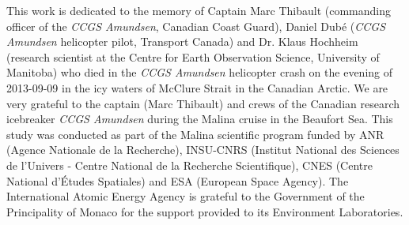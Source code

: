 \documentclass[essd, manuscript]{copernicus}
\begin{document}
\appendixfigures  %

\appendixtables   %




\begin{acknowledgements}
    This work is dedicated to the memory of Captain Marc Thibault (commanding officer of the \textit{CCGS Amundsen}, Canadian Coast Guard), Daniel Dubé (\textit{CCGS Amundsen} helicopter pilot, Transport Canada) and Dr. Klaus Hochheim (research scientist at the Centre for Earth Observation Science, University of Manitoba) who died in the \textit{CCGS Amundsen} helicopter crash on the evening of 2013-09-09 in the icy waters of McClure Strait in the Canadian Arctic. We are very grateful to the captain (Marc Thibault) and crews of the Canadian research icebreaker \textit{CCGS Amundsen} during the Malina cruise in the Beaufort Sea. This study was conducted as part of the Malina scientific program funded by ANR (Agence Nationale de la Recherche), INSU-CNRS (Institut National des Sciences de l’Univers - Centre National de la Recherche Scientifique), CNES (Centre National d'Études Spatiales) and ESA (European Space Agency). The International Atomic Energy Agency is grateful to the Government of the Principality of Monaco for the support provided to its Environment Laboratories.
\end{acknowledgements}






\end{document}

